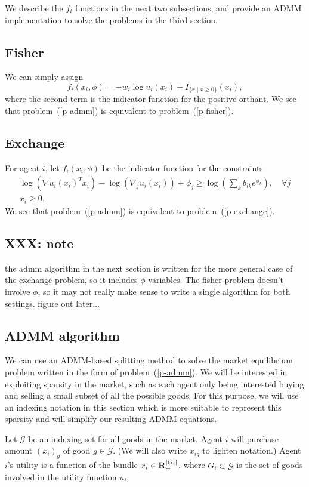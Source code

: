 \documentclass[12pt]{article}
\begin{document}
We describe the $f_i$ functions in the next two subsections, and provide an
ADMM implementation to solve the problems in the third section.

\subsection{Fisher}
We can simply assign
\[
f_i(x_i, \phi) = -w_i \log u_i(x_i) + I_{\lbrace x \mid x \geq 0 \rbrace}(x_i),
\]
where the second term is the indicator function for the positive orthant.
We see that problem~(\ref{p-admm}) is equivalent to
problem~(\ref{p-fisher}).

\subsection{Exchange}

For agent $i$, let $f_i(x_i, \phi)$ be the indicator function for the
constraints
\[
\begin{array}{c}
\log(\nabla u_i(x_i)^T x_i) - \log(\nabla_j u_i(x_i)) + \phi_j \geq  \log\left(\sum_k b_{ik} e^{\phi_{k}}\right),\quad \forall j\\
x_i \geq 0.
\end{array}
\]
We see that problem~(\ref{p-admm}) is equivalent to problem~(\ref{p-exchange}).

\subsection{XXX: note}
the admm algorithm in the next section is written for the more general case of 
the exchange problem, so it includes $\phi$ variables.
The fisher problem doesn't involve $\phi$, so it may not really make sense
to write a single algorithm for both settings. figure out later...

\subsection{ADMM algorithm}
We can use an ADMM-based splitting method \cite{boyd2011distributed} to
solve the market equilibrium problem written in the form of
problem~(\ref{p-admm}).
We will be interested in exploiting sparsity in the market, such
as each agent only being interested buying and selling a small subset 
of all the possible goods.
For this purpose, we will use an indexing notation in this section which is
more suitable to represent this sparsity and will simplify our resulting
ADMM equations.

Let $\mathcal{G}$ be an indexing set for all goods
in the market.
Agent $i$ will purchase amount $(x_i)_g$ of good $g \in \mathcal{G}$.
(We will also write $x_{ig}$ to lighten notation.)
Agent $i$'s utility is a function of the bundle $x_i \in {\mbox{\bf R}}_{+}^{|G_i|}$,
where $G_i \subset \mathcal{G}$ is the set of goods involved in the utility
function $u_i$.
\end{document}
